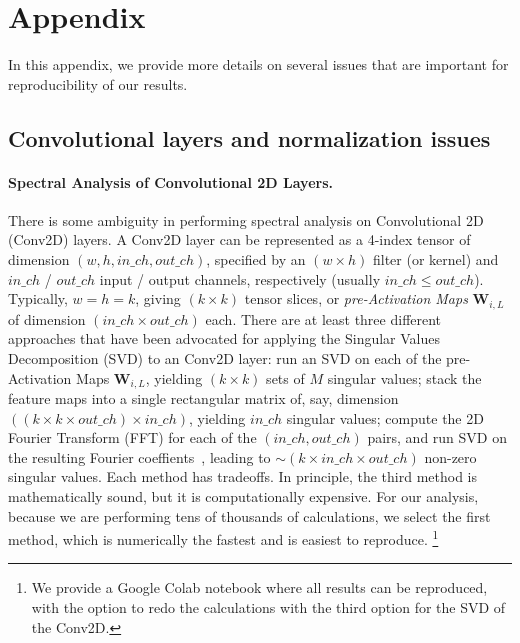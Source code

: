 \section{Appendix}
\label{sxn:appendix}

In this appendix, we provide more details on several issues that are important for reproducibility of our results.

\subsection{Convolutional layers and normalization issues}


\paragraph{Spectral Analysis of Convolutional 2D Layers.}

There is some ambiguity in performing spectral analysis on Convolutional 2D (Conv2D) layers.  
A Conv2D layer can be represented as a 4-index tensor of dimension $(w,h,in\_ch,out\_ch)$, specified by an $(w\times h)$ filter (or kernel) and $in\_ch$ / $out\_ch$ input / output channels, respectively (usually $in\_ch\le out\_ch$). 
Typically, $w=h=k$,  giving $(k\times k)$ tensor slices, or \emph{pre-Activation Maps} $\mathbf{W}_{i,L}$ of dimension $(in\_ch\times out\_ch)$ each. 
%
There are at least three different approaches that have been advocated for applying the Singular Values Decomposition (SVD) to an Conv2D layer:
run an SVD on each of the pre-Activation Maps $\mathbf{W}_{i,L}$, yielding $(k\times k)$ sets of $M$ singular values; 
stack the feature maps into a single rectangular matrix of, say, dimension $((k\times k\times out\_ch)\times in\_ch)$, yielding $in\_ch$ singular values;
compute the 2D Fourier Transform (FFT) for each of the $(in\_ch, out\_ch)$ pairs, and run SVD on the resulting Fourier coeffients~\cite{Long2019}, leading to $\sim(k\times in\_ch\times out\_ch)$ non-zero singular values.
Each method has tradeoffs.  
In principle, the third method is mathematically sound, but it is computationally expensive. 
For our analysis, because we are performing tens of thousands of calculations, we select the first method, which is numerically the fastest and is easiest to reproduce.%
\footnote{We provide a Google Colab notebook where all results can be reproduced, with the option to redo the calculations with the third option for the SVD of the Conv2D.}


